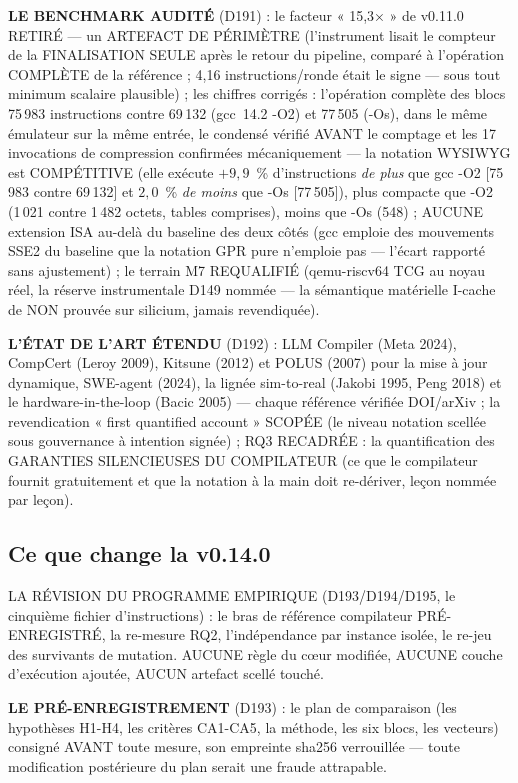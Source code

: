 \textbf{LE BENCHMARK AUDITÉ} (D191) : le facteur « 15,3× » de v0.11.0
RETIRÉ — un ARTEFACT DE PÉRIMÈTRE (l'instrument lisait le compteur de la
FINALISATION SEULE après le retour du pipeline, comparé à l'opération
COMPLÈTE de la référence ; 4,16 instructions/ronde était le signe — sous
tout minimum scalaire plausible) ; les chiffres corrigés : l'opération
complète des blocs 75\,983 instructions contre 69\,132 (gcc~14.2 -O2) et
77\,505 (-Os), dans le même émulateur sur la même entrée, le condensé
vérifié AVANT le comptage et les 17 invocations de compression confirmées
mécaniquement — la notation WYSIWYG est COMPÉTITIVE (elle exécute
$+9{,}9$~\% d'instructions \emph{de plus} que gcc -O2 [75\,983 contre
69\,132] et $2{,}0$~\% \emph{de moins} que -Os [77\,505]), plus compacte que -O2 (1\,021 contre 1\,482 octets, tables
comprises), moins que -Os (548) ; AUCUNE extension ISA au-delà du baseline
des deux côtés (gcc emploie des mouvements SSE2 du baseline que la notation
GPR pure n'emploie pas — l'écart rapporté sans ajustement) ; le terrain M7
REQUALIFIÉ (qemu-riscv64 TCG au noyau réel, la réserve instrumentale D149
nommée — la sémantique matérielle I-cache de  NON prouvée sur
silicium, jamais revendiquée).

\textbf{L'ÉTAT DE L'ART ÉTENDU} (D192) : LLM Compiler (Meta 2024), CompCert
(Leroy 2009), Kitsune (2012) et POLUS (2007) pour la mise à jour dynamique,
SWE-agent (2024), la lignée sim-to-real (Jakobi 1995, Peng 2018) et le
hardware-in-the-loop (Bacic 2005) — chaque référence vérifiée DOI/arXiv ;
la revendication « first quantified account » SCOPÉE (le niveau notation
scellée sous gouvernance à intention signée) ; RQ3 RECADRÉE : la
quantification des GARANTIES SILENCIEUSES DU COMPILATEUR (ce que le
compilateur fournit gratuitement et que la notation à la main doit
re-dériver, leçon nommée par leçon).

\subsection{Ce que change la v0.14.0}\label{sec:nouveautes140}

LA RÉVISION DU PROGRAMME EMPIRIQUE (D193/D194/D195, le cinquième fichier
d'instructions) : le bras de référence compilateur PRÉ-ENREGISTRÉ, la
re-mesure RQ2, l'indépendance par instance isolée, le re-jeu des
survivants de mutation. AUCUNE règle du cœur modifiée, AUCUNE couche
d'exécution ajoutée, AUCUN artefact scellé touché.

\textbf{LE PRÉ-ENREGISTREMENT} (D193) : le plan de comparaison (les
hypothèses H1-H4, les critères CA1-CA5, la méthode, les six blocs, les
vecteurs) consigné AVANT toute mesure, son empreinte sha256 verrouillée —
toute modification postérieure du plan serait une fraude attrapable.

